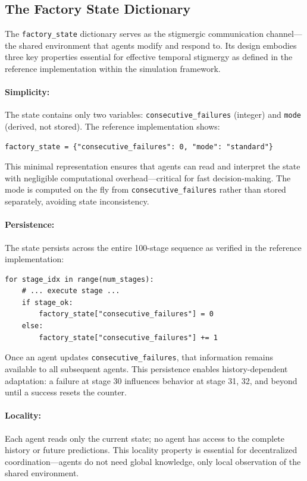 \documentclass[12pt,a4paper,oneside]{report}
\begin{document}
\subsection{The Factory State Dictionary}
\label{subsec:the_factory_state_dictionary}

The \texttt{factory\_state} dictionary serves as the stigmergic communication channel—the shared environment that agents modify and respond to. Its design embodies three key properties essential for effective temporal stigmergy as defined in the reference implementation within the simulation framework.

\paragraph{Simplicity:} The state contains only two variables: \texttt{consecutive\_failures} (integer) and \texttt{mode} (derived, not stored). The reference implementation shows:

\begin{verbatim}
factory_state = {"consecutive_failures": 0, "mode": "standard"}
\end{verbatim}

This minimal representation ensures that agents can read and interpret the state with negligible computational overhead—critical for fast decision-making. The mode is computed on the fly from \texttt{consecutive\_failures} rather than stored separately, avoiding state inconsistency.

\paragraph{Persistence:} The state persists across the entire 100-stage sequence as verified in the reference implementation:

\begin{verbatim}
for stage_idx in range(num_stages):
    # ... execute stage ...
    if stage_ok:
        factory_state["consecutive_failures"] = 0
    else:
        factory_state["consecutive_failures"] += 1
\end{verbatim}

Once an agent updates \texttt{consecutive\_failures}, that information remains available to all subsequent agents. This persistence enables history-dependent adaptation: a failure at stage 30 influences behavior at stage 31, 32, and beyond until a success resets the counter.

\paragraph{Locality:} Each agent reads only the current state; no agent has access to the complete history or future predictions. This locality property is essential for decentralized coordination—agents do not need global knowledge, only local observation of the shared environment.
\end{document}
